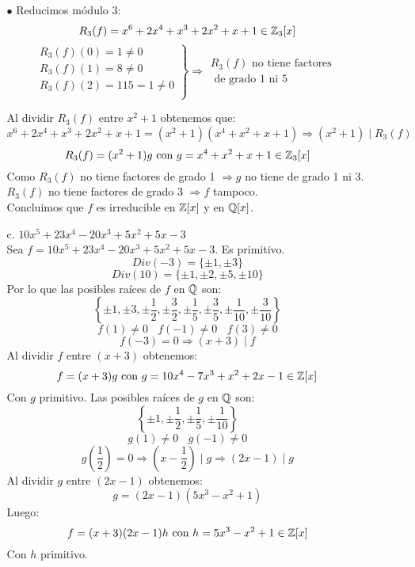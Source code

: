 \documentclass[12pt]{article}
\begin{document}
\begin{ejercicio}[3.5 puntos]
\begin{enumerate}
\begin{enumerate}
                    \noindent
                    $\bullet$ Reducimos módulo 3:
                    $$R_3(f) = x^6 + 2x^4 + x^3 + 2x^2 + x + 1 \in \mathbb{Z}_3[x]$$
                    $$\left. \begin{array}{l}
                        R_3(f)(0) = 1\neq 0 \\
                        R_3(f)(1) = 8 \neq 0 \\
                        R_3(f)(2) = 115 = 1 \neq 0 \\
                    \end{array}\right\} \Rightarrow \begin{array}{l}
                        R_3(f) \text{ no tiene factores } \\
                        \mbox{ de grado 1 ni 5 }
                    \end{array}$$
                    
                    Al dividir $R_3(f)$ entre $x^2+1$ obtenemos que:
                    $$x^6 + 2x^4 + x^3 + 2x^2 + x + 1 = (x^2+1)(x^4+x^2+x+1) \Rightarrow (x^2+1) \mid R_3(f)$$
                    $$R_3(f) = (x^2+1)g \mbox{ con } g=x^4 +x^2+x+1 \in \mathbb{Z}_3[x]$$
                    Como $R_3(f)$ no tiene factores de grado 1 $\Rightarrow g$ no tiene de grado 1 ni 3.\newline
                    $R_3(f)$ no tiene factores de grado 3 $\Rightarrow f$ tampoco.\\

                    \noindent
                    Concluimos que $f$ es irreducible en $\mathbb{Z}[x]$ y en $\mathbb{Q}[x]$.


                \item[c.] $10x^5 + 23x^4 -20x^3 + 5x^2 + 5x-3$\\

                    \noindent
                    Sea $f = 10x^5 + 23x^4 -20x^3 + 5x^2 + 5x-3$. Es primitivo.
                    $$Div(-3) = \{ \pm 1, \pm 3 \}$$
                    $$Div(10) = \{ \pm 1, \pm 2, \pm 5, \pm 10 \}$$
                    Por lo que las posibles raíces de $f$ en $\mathbb{Q}$ son:
                $$\left\{ \pm 1, \pm 3, \pm \dfrac{1}{2}, \pm \dfrac{3}{2}, \pm \dfrac{1}{5}, \pm \dfrac{3}{5}, \pm \dfrac{1}{10}, \pm \dfrac{3}{10} \right\}$$
                    $$f(1) \neq 0~~~~f(-1)\neq 0~~~~f(3) \neq 0$$
                    $$f(-3) = 0 \Rightarrow (x+3)\mid f$$
                    Al dividir $f$ entre $(x+3)$ obtenemos:
                    $$f = (x+3)g \mbox{ con } g=10x^4-7x^3+x^2+2x-1 \in \mathbb{Z}[x]$$
                    Con $g$ primitivo. Las posibles raíces de $g$ en $\mathbb{Q}$ son:
                    $$\left\{ \pm 1, \pm \dfrac{1}{2}, \pm \dfrac{1}{5}, \pm \dfrac{1}{10} \right\}$$
                    $$g(1) \neq 0~~~~g(-1)\neq 0$$
                    $$g\left(\dfrac{1}{2}\right) = 0 \Rightarrow \left(x-\dfrac{1}{2}\right) \mid g \Rightarrow (2x-1)\mid g$$
                    Al dividir $g$ entre $(2x-1)$ obtenemos:
                    $$g = (2x-1)(5x^3-x^2+1)$$
                    Luego:
                    $$f = (x+3)(2x-1)h \mbox{ con } h = 5x^3-x^2+1 \in \mathbb{Z}[x]$$
                    Con $h$ primitivo.


\end{enumerate}
\end{enumerate}
\end{ejercicio}
\end{document}
